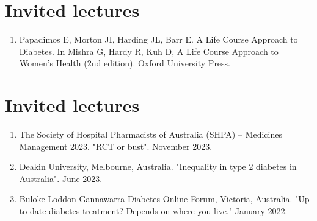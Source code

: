 \documentclass[11pt]{article}
\begin{document}
\section*{Invited lectures}
\begin{enumerate}
\item Papadimos E, Morton JI, Harding JL, Barr E. 
A Life Course Approach to Diabetes. 
In Mishra G, Hardy R, Kuh D, A Life Course Approach to Women's Health (2nd edition). 
Oxford University Press.  
\end{enumerate}

\section*{Invited lectures}
\begin{enumerate}
\item The Society of Hospital Pharmacists of Australia (SHPA) – Medicines Management 2023. "RCT or bust". November 2023.
\item Deakin University, Melbourne, Australia. "Inequality in type 2 diabetes in Australia". June 2023. 
\item Buloke Loddon Gannawarra Diabetes Online Forum, Victoria, Australia. "Up-to-date diabetes treatment? Depends on where you live." January 2022.  
\end{enumerate}

\end{document}
